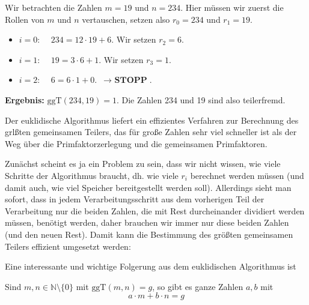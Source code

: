 \begin{beispiel}\label{gruppe_bsp_teilerfremd_1} 
Wir betrachten die Zahlen $m = 19$ und $n = 234$. Hier müssen wir zuerst die Rollen 
von $m$ und $n$ vertauschen, setzen also $r_0 = 234$ und $r_1 = 19$. 

\begin{itemize}
\item[ ]$i = 0$: $\quad 234 = 12 \cdot 19 + 6$. Wir setzen $r_2 = 6$.
\item[ ]$i = 1$: $\quad 19 = 3 \cdot 6 + 1$. Wir setzen $r_3 = 1$.
\item[ ]$i = 2$: $\quad 6 = 6 \cdot 1 + 0$.  $\, \longrightarrow \textbf{ STOPP}$.
\end{itemize}

\textbf{Ergebnis:} $\textrm{ggT}(234, 19) = 1$. Die Zahlen 234 und 19 sind also teilerfremd.
\end{beispiel}

\begin{notiz}
Der euklidische Algorithmus liefert ein effizientes Verfahren zur Berechnung des grlßten gemeinsamen Teilers, 
das für große Zahlen sehr viel schneller ist als der Weg über die Primfaktorzerlegung und die gemeinsamen 
Primfaktoren. 

Zunächst scheint es ja ein Problem zu sein, dass wir nicht wissen, wie viele Schritte der Algorithmus braucht, 
dh. wie viele $r_i$ berechnet werden müssen (und damit auch, wie viel Speicher bereitgestellt werden soll). 
Allerdings sieht man sofort, dass in jedem Verarbeitungsschritt aus dem vorherigen Teil der Verarbeitung 
nur die beiden Zahlen, die mit Rest durcheinander dividiert werden müssen, benötigt werden, daher brauchen 
wir immer nur diese beiden Zahlen (und den neuen Rest). Damit kann die Bestimmung des größten gemeinsamen 
Teilers effizient umgesetzt werden: 

\makebox[\textwidth]{\hrulefill}  

\makebox[\textwidth]{\hrulefill} 

\end{notiz}

\medbreak

Eine interessante  und wichtige Folgerung aus dem euklidischen Algorithmus ist

\begin{satz}\label{gruppe_erw_euklid} Sind $m,n\in \mathbb N \setminus \{0 \}$ mit 
$\textrm{ggT}(m,n) = g$, so gibt es ganze Zahlen $a,b$ mit 
  	$$ a \cdot m + b \cdot n = g $$
\end{satz}

